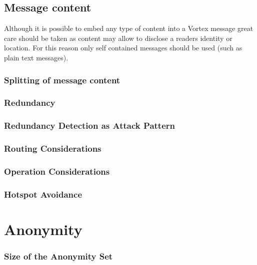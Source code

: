 \section{Message content}
Although it is possible to embed any type of content into a Vortex message great care should be taken as content may allow to disclose a readers identity or location. For this reason only self contained messages should be used (such as plain text messages).

\subsection{Splitting of message content}

\subsection{Redundancy}

\subsection{Redundancy Detection as Attack Pattern}

\subsection{Routing Considerations}

\subsection{Operation Considerations}

\subsection{Hotspot Avoidance}


\chapter{Anonymity}

\subsection{Size of the Anonymity Set}

